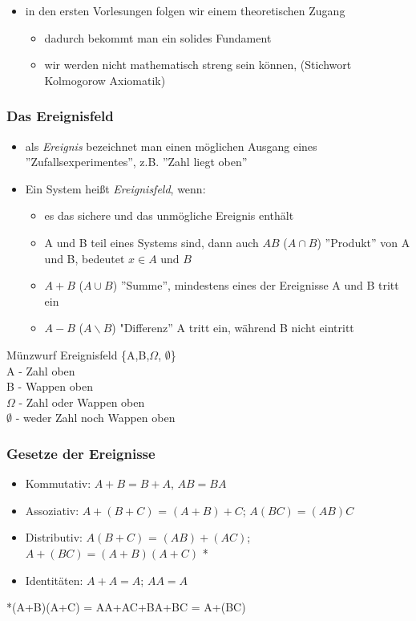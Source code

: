 \documentclass[../VorlesungMaster.tex]{subfiles}
\begin{document}
\begin{itemize}
	\item in den ersten Vorlesungen folgen wir einem theoretischen Zugang
	\begin{itemize}
		\item dadurch bekommt man ein solides Fundament
		\item wir werden nicht mathematisch streng sein können, (Stichwort Kolmogorow Axiomatik)
	\end{itemize}
\end{itemize}
\subsubsection{Das Ereignisfeld}
\begin{itemize}
	\item als \textit{Ereignis} bezeichnet man einen möglichen Ausgang eines ''Zufallsexperimentes'', z.B. ''Zahl liegt oben''
	\item Ein System heißt \textit{Ereignisfeld}, wenn:
	\begin{itemize}
		\item es das sichere und das unmögliche Ereignis enthält

				\item A und B teil eines Systems sind, dann auch $AB$ ($A\cap B$) ''Produkt'' von A und B, bedeutet $x \in A \text{ und } B$
			\item $A+B$ ($A \cup B$) ''Summe'', mindestens eines der Ereignisse A und B tritt ein
			\item $A-B$ ($A\backslash B$) "Differenz'' A tritt ein, während B nicht eintritt

	
	\end{itemize}
\end{itemize}
\begin{exmp}
	Münzwurf Ereignisfeld \{A,B,$\Omega$, $\emptyset$\}\\
	A - Zahl oben\\B - Wappen oben \\ $\Omega$ - Zahl oder Wappen oben \\ $\emptyset$ - weder Zahl noch Wappen oben
\end{exmp}

\subsubsection{Gesetze der Ereignisse}
\begin{itemize}
	\item Kommutativ: $A+B = B+A$, $AB = BA$
	\item Assoziativ: $A+(B+C)$ = $(A+B)+C$; $A(BC) = (AB)C$
	\item Distributiv: $A(B+C)$ = $(AB)+(AC)$; $A+(BC) = (A+B)(A+C)$ *
	\item Identitäten: $A+A = A$; $AA = A$
\end{itemize}
*(A+B)(A+C) = AA+AC+BA+BC = A+(BC)
\end{document}
